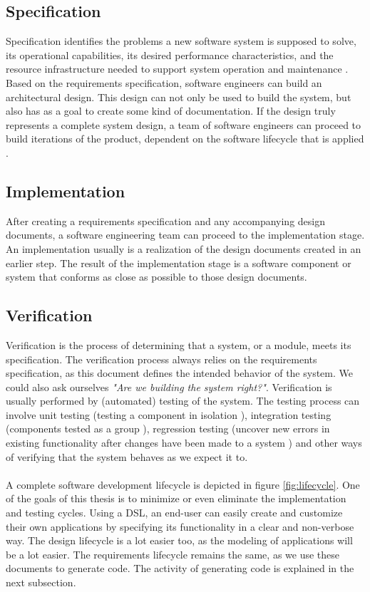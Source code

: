 \subsection{Specification}

Specification identifies the problems a new software system is supposed to solve, its operational capabilities, its desired performance characteristics, and the resource infrastructure needed to support system operation and maintenance \cite{ProcessModels}. Based on the requirements specification, software engineers can build an architectural design. This design can not only be used to build the system, but also has as a goal to create some kind of documentation. If the design truly represents a complete system design, a team of software engineers can proceed to build iterations of the product, dependent on the software lifecycle that is applied \cite{SoftwareDesign}.

\subsection{Implementation}

After creating a requirements specification and any accompanying design documents, a software engineering team can proceed to the implementation stage. An implementation usually is a realization of the design documents created in an earlier step. The result of the implementation stage is a software component or system that conforms as close as possible to those design documents.

\subsection{Verification}

Verification is the process of determining that a system, or a module, meets its specification. The verification process always relies on the requirements specification, as this document defines the intended behavior of the system. We could also ask ourselves \textit{"Are we building the system right?"}. Verification is usually performed by (automated) testing of the system. The testing process can involve unit testing (testing a component in isolation \cite{UnitTesting}), integration testing (components tested as a group \cite{IntegrationTesting}), regression testing (uncover new errors in existing functionality after changes have been made to a system \cite{RegressionTesting}) and other ways of verifying that the system behaves as we expect it to.
\\ \\
A complete software development lifecycle is depicted in figure \ref{fig:lifecycle}. One of the goals of this thesis is to minimize or even eliminate the implementation and testing cycles. Using a DSL, an end-user can easily create and customize their own applications by specifying its functionality in a clear and non-verbose way. The design lifecycle is a lot easier too, as the modeling of applications will be a lot easier. The requirements lifecycle remains the same, as we use these documents to generate code. The activity of generating code is explained in the next subsection.

